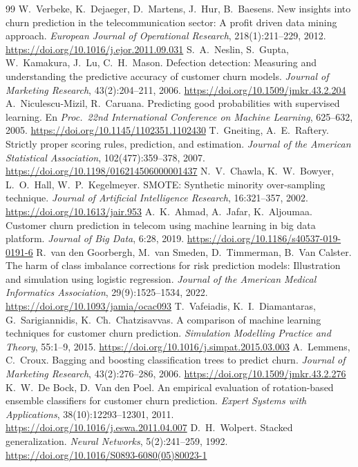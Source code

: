 \documentclass[11pt,a4paper]{article}
\newcommand{\doi}[1]{\url{https://doi.org/#1}}
\begin{document}
\begin{thebibliography}{99}\small
{} W.~Verbeke, K.~Dejaeger, D.~Martens, J.~Hur, B.~Baesens. New insights into churn prediction in the telecommunication sector: A profit driven data mining approach. \emph{European Journal of Operational Research}, 218(1):211--229, 2012. \doi{10.1016/j.ejor.2011.09.031}
 S.~A.~Neslin, S.~Gupta, W.~Kamakura, J.~Lu, C.~H.~Mason. Defection detection: Measuring and understanding the predictive accuracy of customer churn models. \emph{Journal of Marketing Research}, 43(2):204--211, 2006. \doi{10.1509/jmkr.43.2.204}
 A.~Niculescu-Mizil, R.~Caruana. Predicting good probabilities with supervised learning. En \emph{Proc.\ 22nd International Conference on Machine Learning}, 625--632, 2005. \doi{10.1145/1102351.1102430}
 T.~Gneiting, A.~E.~Raftery. Strictly proper scoring rules, prediction, and estimation. \emph{Journal of the American Statistical Association}, 102(477):359--378, 2007. \doi{10.1198/016214506000001437}
 N.~V.~Chawla, K.~W.~Bowyer, L.~O.~Hall, W.~P.~Kegelmeyer. SMOTE: Synthetic minority over-sampling technique. \emph{Journal of Artificial Intelligence Research}, 16:321--357, 2002. \doi{10.1613/jair.953}
 A.~K.~Ahmad, A.~Jafar, K.~Aljoumaa. Customer churn prediction in telecom using machine learning in big data platform. \emph{Journal of Big Data}, 6:28, 2019. \doi{10.1186/s40537-019-0191-6}
 R.~van den Goorbergh, M.~van Smeden, D.~Timmerman, B.~Van Calster. The harm of class imbalance corrections for risk prediction models: Illustration and simulation using logistic regression. \emph{Journal of the American Medical Informatics Association}, 29(9):1525--1534, 2022. \doi{10.1093/jamia/ocac093}
 T.~Vafeiadis, K.~I.~Diamantaras, G.~Sarigiannidis, K.~Ch.~Chatzisavvas. A comparison of machine learning techniques for customer churn prediction. \emph{Simulation Modelling Practice and Theory}, 55:1--9, 2015. \doi{10.1016/j.simpat.2015.03.003}
 A.~Lemmens, C.~Croux. Bagging and boosting classification trees to predict churn. \emph{Journal of Marketing Research}, 43(2):276--286, 2006. \doi{10.1509/jmkr.43.2.276}
 K.~W.~De Bock, D.~Van den Poel. An empirical evaluation of rotation-based ensemble classifiers for customer churn prediction. \emph{Expert Systems with Applications}, 38(10):12293--12301, 2011. \doi{10.1016/j.eswa.2011.04.007}
 D.~H.~Wolpert. Stacked generalization. \emph{Neural Networks}, 5(2):241--259, 1992. \doi{10.1016/S0893-6080(05)80023-1}

\end{thebibliography}
\end{document}
